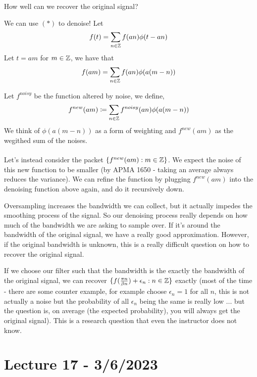 \documentclass{article}
\begin{document}
\begin{question}
    How well can we recover the original signal?
\end{question}

We can use $(*)$ to denoise! Let
\[f(t) = \sum_{n \in \mathbb{Z}} f(an) \phi(t - an)\]
Let $t = am$ for $m \in \mathbb{Z}$, we have that
\[f(am) = \sum_{n \in \mathbb{Z}} f(an) \phi(a(m - n))\]

\begin{definition}
Let $f^{noisy}$ be the function altered by noise, we define,
    $$f^{new}(am) \coloneqq \sum_{n \in \mathbb{Z}} f^{noisy}(an) \phi(a(m-n))$$
We think of $\phi(a(m-n))$ as a form of weighting and $f^{new}(am)$ as the wegithed sum of the noises.\\\\
Let's instead consider the packet $\{f^{new}(am): m \in \mathbb{Z}\}$. We expect the noise of this new function to be smaller (by APMA 1650 - taking an average always reduces the variance). We can refine the function by plugging $f^{new}(am)$ into the denoising function above again, and do it recursively down.
\end{definition}

\begin{remark}
Oversampling increases the bandwidth we can collect, but it actually impedes the smoothing process of the signal. So our denoising process really depends on how much of the bandwidth we are asking to sample over. If it's around the bandwidth of the original signal, we have a really good approximation. However, if the original bandwidth is unknown, this is a really difficult question on how to recover the original signal.    
\end{remark}

\begin{conjecture}
If we choose our filter such that the bandwidth is the exactly the bandwidth of the original signal, we can recover $\{f(\frac{\pi n}{\beta n}) + \epsilon_n: n \in \mathbb{Z}\}$ exactly (most of the time - there are some counter example, for example choose $\epsilon_n = 1$ for all $n$, this is not actually a noise but the probability of all $\epsilon_n$ being the same is really low ... but the question is, on average (the expected probability), you will always get the original signal). This is a research question that even the instructor does not know.
\end{conjecture}

\newpage
\section{Lecture 17 - 3/6/2023}
\end{document}
